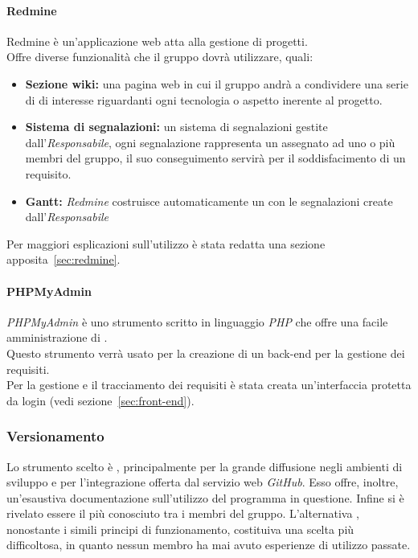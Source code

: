 \documentclass{scalatekids-article}
\begin{document}
\paragraph{Redmine}

Redmine è un'applicazione web atta alla gestione di progetti.\\
Offre diverse funzionalità che il gruppo dovrà utilizzare, quali:
\begin{itemize}
    \item\textbf{Sezione wiki:} una pagina web in cui il gruppo andrà a condividere una serie di  di interesse riguardanti ogni tecnologia o aspetto inerente al progetto.
    \item\textbf{Sistema di segnalazioni:} un sistema di segnalazioni gestite dall'\textit{Responsabile}, ogni segnalazione rappresenta un  assegnato ad uno o più membri del gruppo, il suo conseguimento servirà per il soddisfacimento di un requisito.
    \item\textbf{Gantt:} \textit{Redmine} costruisce automaticamente un  con le segnalazioni create dall'\textit{Responsabile}
\end{itemize}
Per maggiori esplicazioni sull'utilizzo è stata redatta una sezione apposita~\ref{sec:redmine}.

\paragraph{PHPMyAdmin}

\textit{PHPMyAdmin} è uno strumento scritto in linguaggio \textit{PHP} che offre una facile amministrazione di \textit{}.\\
Questo strumento verrà usato per la creazione di un back-end per la gestione dei requisiti.\\
Per la gestione e il tracciamento dei requisiti è stata creata un'interfaccia protetta da login (vedi sezione~\ref{sec:front-end}).

\subsubsection{Versionamento}

Lo strumento scelto è , principalmente per la grande diffusione negli
ambienti di sviluppo e per l'integrazione offerta dal servizio web
\textit{GitHub}. Esso offre, inoltre, un'esaustiva documentazione
sull'utilizzo del programma in questione. Infine  si è rivelato essere
il più conosciuto tra i membri del gruppo. L'alternativa , nonostante
i simili principi di funzionamento, costituiva una scelta più difficoltosa, in
quanto nessun membro ha mai avuto esperienze di utilizzo passate.
\end{document}
